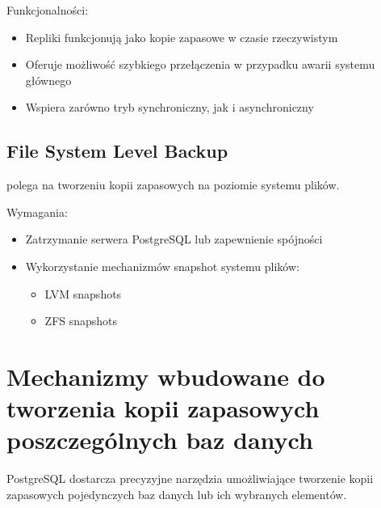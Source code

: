 \documentclass[a4paper,11pt,polish]{sphinxmanual}
\begin{document}
\sphinxAtStartPar
Funkcjonalności:
\begin{itemize}
\item {} 
\sphinxAtStartPar
Repliki funkcjonują jako kopie zapasowe w czasie rzeczywistym

\item {} 
\sphinxAtStartPar
Oferuje możliwość szybkiego przełączenia w przypadku awarii systemu głównego

\item {} 
\sphinxAtStartPar
Wspiera zarówno tryb synchroniczny, jak i asynchroniczny

\end{itemize}


\subsection{File System Level Backup}
\label{\detokenize{Kopie_zapasowe_i_odzyskiwanie_danych/kopie_zapasowe_i_odzyskiwanie_danych:file-system-level-backup}}
\sphinxAtStartPar
{} polega na tworzeniu kopii zapasowych na poziomie systemu plików.

\sphinxAtStartPar
Wymagania:
\begin{itemize}
\item {} 
\sphinxAtStartPar
Zatrzymanie serwera PostgreSQL lub zapewnienie spójności

\item {} 
\sphinxAtStartPar
Wykorzystanie mechanizmów snapshot systemu plików:
\begin{itemize}
\item {} 
\sphinxAtStartPar
LVM snapshots

\item {} 
\sphinxAtStartPar
ZFS snapshots

\end{itemize}

\end{itemize}


\section{Mechanizmy wbudowane do tworzenia kopii zapasowych poszczególnych baz danych}
\label{\detokenize{Kopie_zapasowe_i_odzyskiwanie_danych/kopie_zapasowe_i_odzyskiwanie_danych:mechanizmy-wbudowane-do-tworzenia-kopii-zapasowych-poszczegolnych-baz-danych}}
\sphinxAtStartPar
PostgreSQL dostarcza precyzyjne narzędzia umożliwiające tworzenie kopii zapasowych pojedynczych baz danych lub ich wybranych elementów.
\end{document}
